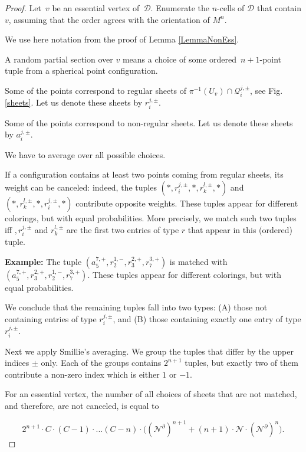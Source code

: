 \documentclass[12pt]{amsart}
\theoremstyle{plain}
\theoremstyle{definition}
\theoremstyle{plain}
\theoremstyle{definition}
\begin{document}
 \begin{proof}
 Let~$v$ be an essential vertex of~${\mathcal{D}}$.
 Enumerate  the $n$-cells of $\mathcal{D}$ that contain $v$, assuming that the order agrees with the orientation of $M^n$. 
 
 We use here notation from the proof of Lemma \ref{LemmaNonEss}.
 
  A random partial section over  $v$  means a choice of some ordered~$n+1$-point tuple from a spherical point configuration. 
  
  Some of the points correspond to regular sheets  of  $\pi^{-1}(U_v) \cap \mathcal{Q}_i^{j,\pm}$, see Fig. \ref{sheets}.
   Let us denote these sheets by $r_i^{j,\pm}$.
  
  Some of the points correspond to non-regular sheets. Let us denote these sheets by $a_i^{j,\pm}$.
  
  We have to average over all possible choices.
  
  If a configuration contains at least two points coming from regular sheets, its weight can be canceled: indeed, the
  tuples $(*,r_i^{j,\pm},*,r_k^{l,\pm},*)$  and $(*,r_k^{l,\pm},*,r_i^{j,\pm},*)$  contribute  opposite weights. These tuples appear for different colorings, but with equal probabilities. More precisely, we match such two tuples iff $,r_i^{j,\pm}$ and $r_k^{l,\pm}$ are the first two entries of type $r$ that appear in this (ordered) tuple.
  
  
  \medskip
 \textbf{ Example:} The tuple $(a_5^{7,+},r_2^{1,-},r_3^{2,+},r_7^{3,+})$ is matched with $(a_5^{7,+},r_3^{2,+},r_2^{1,-},r_7^{3,+})$. These tuples appear for different colorings, but with equal probabilities.
 \medskip
  
  We conclude that the remaining tuples fall into two types: (A) those not containing entries of type $r_i^{j,\pm}$, and (B) those containing exactly one entry of type $r_i^{j,\pm}$.
  
  Next we apply Smillie's averaging. We group the tuples that differ by the upper indices $\pm$ only. Each of the groups contains $2^{n+1}$ tuples, but exactly two of them contribute a non-zero index which is either $1$ or $-1$.
  

 \medskip
 
 For an essential vertex, the number of all choices of sheets that are not matched, and therefore, are not canceled, is equal to
 
 $$2^{n+1}\cdot C\cdot(C-1)\cdot ...(C-n)\cdot\Big((\mathcal{N}^\partial)^{n+1} +(n+1)\cdot \mathcal{N} \cdot (\mathcal{N}^\partial)^{n}\Big). $$



\end{proof}
\end{document}
